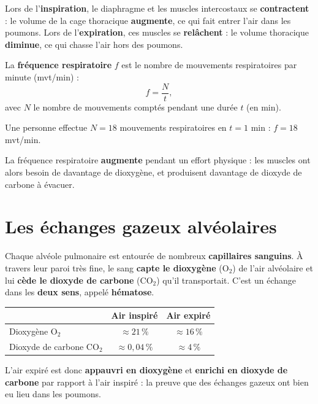 \begin{propriete}
Lors de l'\textbf{inspiration}, le diaphragme et les muscles intercostaux se
\textbf{contractent} : le volume de la cage thoracique \textbf{augmente}, ce qui fait
entrer l'air dans les poumons. Lors de l'\textbf{expiration}, ces muscles se
\textbf{relâchent} : le volume thoracique \textbf{diminue}, ce qui chasse l'air hors des
poumons.
\end{propriete}

\begin{definition}
La \textbf{fréquence respiratoire} $f$ est le nombre de mouvements respiratoires par
minute (mvt/min) :
\[
f=\frac Nt,
\]
avec $N$ le nombre de mouvements comptés pendant une durée $t$ (en min).
\end{definition}

\begin{exemple}
Une personne effectue $N=18$ mouvements respiratoires en $t=1$ min : $f=18$ mvt/min.
\end{exemple}

\begin{remarque}
La fréquence respiratoire \textbf{augmente} pendant un effort physique : les muscles ont
alors besoin de davantage de dioxygène, et produisent davantage de dioxyde de carbone à
évacuer.
\end{remarque}

\section{Les échanges gazeux alvéolaires}

\begin{propriete}
Chaque alvéole pulmonaire est entourée de nombreux \textbf{capillaires sanguins}. À
travers leur paroi très fine, le sang \textbf{capte le dioxygène} ($\mathrm{O_2}$) de
l'air alvéolaire et lui \textbf{cède le dioxyde de carbone} ($\mathrm{CO_2}$) qu'il
transportait. C'est un échange dans les \textbf{deux sens}, appelé \textbf{hématose}.
\end{propriete}

\begin{propriete}
\begin{center}
\small
\begin{tabular}{lcc}
\toprule
& \textbf{Air inspiré} & \textbf{Air expiré} \\
\midrule
Dioxygène $\mathrm{O_2}$ & $\approx21\,\%$ & $\approx16\,\%$ \\
Dioxyde de carbone $\mathrm{CO_2}$ & $\approx0{,}04\,\%$ & $\approx4\,\%$ \\
\bottomrule
\end{tabular}
\end{center}
L'air expiré est donc \textbf{appauvri en dioxygène} et \textbf{enrichi en dioxyde de
carbone} par rapport à l'air inspiré : la preuve que des échanges gazeux ont bien eu lieu
dans les poumons.
\end{propriete}

